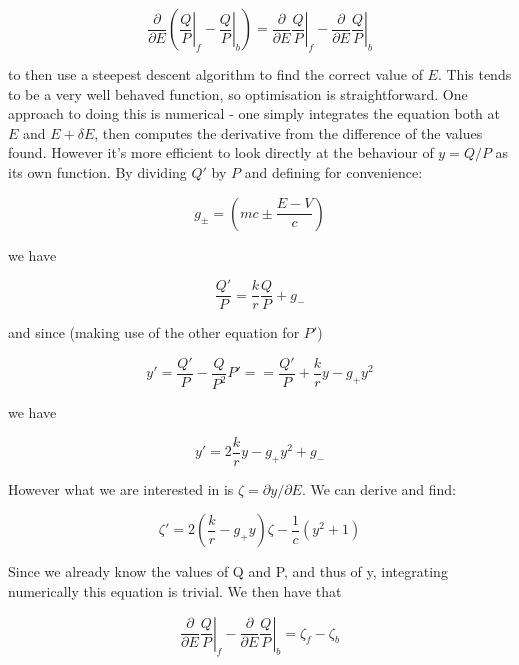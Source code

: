 \documentclass[]{report}
\begin{document}
\begin{equation}
\frac{\partial}{\partial E}\left(\left. \frac{Q}{P}\right|_f - \left. \frac{Q}{P}\right|_b\right) = 
\frac{\partial}{\partial E}\left. \frac{Q}{P}\right|_f - \frac{\partial}{\partial E}\left. \frac{Q}{P}\right|_b
\end{equation}

to then use a steepest descent algorithm to find the correct value of $E$. This tends to be a very well behaved function, so optimisation is straightforward. One approach to doing this is numerical - one simply integrates the equation both at $E$ and $E+\delta E$, then computes the derivative from the difference of the values found. However it's more efficient to look directly at the behaviour of $y = Q/P$ as its own function. By dividing $Q'$ by $P$ and defining for convenience:

\begin{equation}
g_\pm = \left(mc\pm\frac{E-V}{c}\right)
\end{equation}

we have

\begin{equation}
\frac{Q'}{P} = \frac{k}{r}\frac{Q}{P}+g_-
\end{equation}

and since (making use of the other equation for $P'$)

\begin{equation}
y' = \frac{Q'}{P} - \frac{Q}{P^2}P' = = \frac{Q'}{P} + \frac{k}{r} y -g_+y^2
\end{equation}

we have

\begin{equation}
y' = 2\frac{k}{r}y-g_+y^2+g_-
\end{equation}

However what we are interested in is $\zeta = \partial y / \partial E$. We can derive and find:

\begin{equation}
\zeta' = 2\left(\frac{k}{r}-g_+y\right)\zeta-\frac{1}{c}(y^2+1)
\end{equation}

Since we already know the values of Q and P, and thus of y, integrating numerically this equation is trivial. We then have that

\begin{equation}
\frac{\partial}{\partial E}\left. \frac{Q}{P}\right|_f - \frac{\partial}{\partial E}\left. \frac{Q}{P}\right|_b = \zeta_f-\zeta_b
\end{equation}




\end{document}
